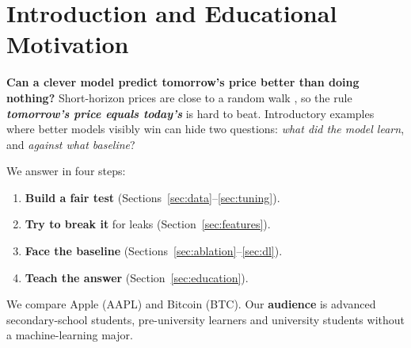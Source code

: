 \section{Introduction and Educational Motivation}
\label{sec:intro}

\textbf{Can a clever model predict tomorrow's price better than doing nothing?}
Short-horizon prices are close to a random walk \citep{fama1970efficient}, so the
rule \textbf{\emph{tomorrow's price equals today's}} is hard to beat. Introductory
examples where better models visibly win can hide two questions:
\emph{what did the model learn}, and \emph{against what baseline}?

We answer in four steps:
\begin{enumerate}
  \item \textbf{Build a fair test} (Sections~\ref{sec:data}--\ref{sec:tuning}).
  \item \textbf{Try to break it} for leaks (Section~\ref{sec:features}).
  \item \textbf{Face the baseline} (Sections~\ref{sec:ablation}--\ref{sec:dl}).
  \item \textbf{Teach the answer} (Section~\ref{sec:education}).
\end{enumerate}

We compare Apple (AAPL) and Bitcoin (BTC). Our \textbf{audience} is advanced
secondary-school students, pre-university learners and university students without
a machine-learning major.
